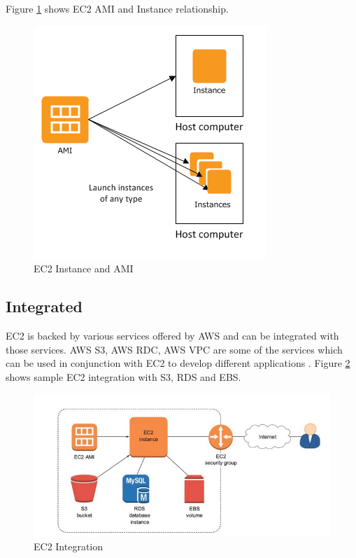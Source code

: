 Figure \ref{f:ec2-ami-instance} shows EC2 AMI and Instance relationship.
\begin{figure}[!ht]
  \centering\includegraphics[width=\columnwidth]{images/ec2AMI.PNG}
  \caption{EC2 Instance and AMI \cite{hid-sp18-402-www-aws-ec2instance}}\label{f:ec2-ami-instance}
\end{figure}

\subsection{Integrated}
EC2 is backed by various services offered by AWS and can be integrated with those services. AWS S3, AWS RDC, AWS VPC are some of the services which can be used in conjunction with EC2 to develop different applications \cite{hid-sp18-402-www-aws-ec2}.
Figure \ref{f:ec2-integration} shows sample EC2 integration with S3, RDS and EBS.
\begin{figure}[!ht]
  \centering\includegraphics[width=\columnwidth]{images/ec2Integration.PNG}
  \caption{EC2 Integration \cite{hid-sp18-402-www-medium-aws}}\label{f:ec2-integration}
\end{figure}

